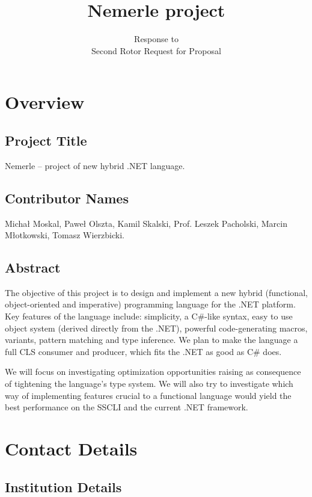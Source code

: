 \documentclass[a4paper,11pt]{article}
\title{Nemerle project}
\author{Response to\\Second Rotor Request for Proposal}
\date{}
\begin{document}
\maketitle
\thispagestyle{empty}

\section{Overview}

\subsection{Project Title}

Nemerle -- project of new hybrid .NET language.

\subsection{Contributor Names}
Micha{\l} Moskal, Pawe{\l} Olszta, Kamil Skalski, Prof. Leszek Pacholski, Marcin M{\l}otkowski,
Tomasz Wierzbicki.

\subsection{Abstract}

The objective of this project is to design and implement a new 
hybrid (functional, object-oriented and imperative) programming 
language for the .NET platform. Key features of the language 
include: simplicity, a C\#-like syntax, easy to use object 
system (derived directly from the .NET), powerful code-generating 
macros, variants, pattern matching and type inference. We plan 
to make the language a full CLS consumer and producer, which 
fits the .NET as good as C\# does.

We will focus on investigating optimization opportunities 
raising as consequence of tightening the language's type system.
We will also try to investigate which way of implementing features
crucial to a functional language would yield the best performance 
on the SSCLI and the current .NET framework.


\section{Contact Details}


\subsection{Institution Details}
\end{document}

